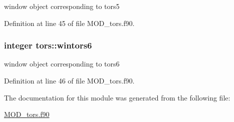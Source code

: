window object corresponding to tors5 



Definition at line 45 of file M\-O\-D\-\_\-tors.\-f90.

\hypertarget{classtors_a1f3c7a1dc9da4c4ea78cdfc6d72a0e33}{
\subsubsection[{wintors6}]{\setlength{\rightskip}{0pt plus 5cm}integer tors\-::wintors6}}\label{classtors_a1f3c7a1dc9da4c4ea78cdfc6d72a0e33}


window object corresponding to tors6 



Definition at line 46 of file M\-O\-D\-\_\-tors.\-f90.



The documentation for this module was generated from the following file\-:\begin{DoxyCompactItemize}
\item 
\hyperlink{MOD__tors_8f90}{M\-O\-D\-\_\-tors.\-f90}\end{DoxyCompactItemize}
